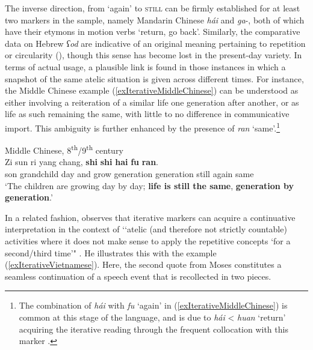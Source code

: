 The inverse direction, from \lq again' to \textsc{still} can be firmly established for at least two markers in the sample, namely Mandarin Chinese \textit{hái} and  \mbox{\textit{ga}-}, both of which have their etymons in motion verbs \lq return, go back\rq{}. Similarly, the comparative data on Hebrew \textit{ʕod} are indicative of an original meaning pertaining to repetition or circularity (\cite[s.v. ]{BrownEtAl}), though this sense has become lost in the present-day variety. In terms of actual usage, a  plausible link is found in those instances in which a snapshot of the same atelic situation is given across different times. For instance, the Middle Chinese example (\ref{exIterativeMiddleChinese}) can be understood as either involving a reiteration of a similar life one generation after another, or as life as such remaining the same, with little to no difference in communicative import. This ambiguity is further enhanced by the presence of \textit{ran} \lq same'.\footnote{The combination of \textit{hái} with \textit{fu} \lq again' in (\ref{exIterativeMiddleChinese}) is common at this stage of the language, and is due to \textit{hái} < \textit{huan} \lq return\rq{ }acquiring the iterative reading through the frequent collocation with this marker \parencite{Yeh1998}.}

\begin{exe}
	\ex Middle Chinese,  8\textsuperscript{th}/9\textsuperscript{th} century\label{exIterativeMiddleChinese}\\
	\gll Zi sun ri yang chang, \textbf{shi} \textbf{shi} \textbf{hai} \textbf{fu} \textbf{ran}.\\
	son grandchild day and grow generation generation still again same\\
	\glt \lq The children are growing day by day; \textbf{life is still the same}, \textbf{generation by generation}.' \parencite[247]{Yeh1998}
\end{exe}

In a related fashion, \textcite{Waelchli2006} observes that iterative markers can acquire a continuative interpretation in the context of \lq\lq atelic (and therefore not strictly countable) activities where it does not make sense to apply the repetitive concepts \lq for a second/third time’" \parencite[76]{Waelchli2006}. He illustrates this with the  example (\ref{exIterativeVietnamese}). Here, the second quote from Moses constitutes a seamless continuation of a speech event that is recollected in two pieces.

